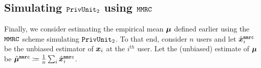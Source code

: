 
\subsection{Simulating \texorpdfstring{$\texttt{PrivUnit}_2$}{PrivUnit} using \texorpdfstring{$\texttt{MMRC}$}{MMRC}}
\label{subsec:sim_pu1}

Finally, we consider estimating the empirical mean ${\boldsymbol{\mu}}$ defined earlier using the $\texttt{MMRC}$ scheme simulating $\texttt{PrivUnit}_2$. To that end, consider $n$ users and let $\hat{{\boldsymbol{x}}}^{\texttt{mmrc}}_i$ be the unbiased estimator of ${\boldsymbol{x}}_i$ at the $i^{th}$ user. Let the (unbiased) estimate of ${\boldsymbol{\mu}}$ be $\hat{{\boldsymbol{\mu}}}^{\texttt{mmrc}} \coloneqq \frac{1}{n}\sum_i \hat{{\boldsymbol{x}}}^{\texttt{mmrc}}_i$. 

